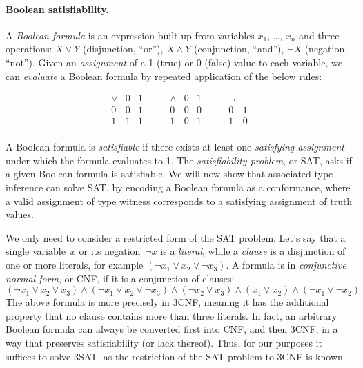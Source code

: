 \documentclass[../generics]{subfiles}
\begin{document}
\paragraph{Boolean satisfiability.}
A \emph{Boolean formula} is an expression built up from variables $x_1$, \ldots, $x_n$ and three operations: $X \vee Y$ (disjunction, ``or''), $X \wedge Y$ (conjunction, ``and''), $\neg X$ (negation, ``not''). Given an \emph{assignment} of a 1 (true) or 0 (false) value to each variable, we can \emph{evaluate} a Boolean formula by repeated application of the below rules:
\begin{ceqn}
\[
\begin{array}{c|cc}
\vee & 0 & 1\\
\hline
0 & 0 & 1\\
1 & 1 & 1\\
\end{array}
\qquad
\begin{array}{c|cc}
\wedge & 0 & 1\\
\hline
0 & 0 & 0\\
1 & 0 & 1\\
\end{array}
\qquad
\begin{array}{c|c}
\neg &\\
\hline
0 & 1\\
1 & 0
\end{array}
\]
\end{ceqn}
A Boolean formula is \emph{satisfiable} if there exists at least one \emph{satisfying assignment} under which the formula evaluates to 1. The \emph{satisfiability problem}, or SAT, asks if a given Boolean formula is satisfiable. We will now show that associated type inference can solve SAT, by encoding a Boolean formula as a conformance, where a valid assignment of type witness corresponds to a satisfying assignment of truth values.

We only need to consider a restricted form of the SAT problem. Let's say that a single variable~$x$ or its negation~$\neg x$ is a \emph{literal}, while a \emph{clause} is a disjunction of one or more literals, for example $(\neg x_1 \vee x_2 \vee \neg x_3)$. A formula is in \emph{conjunctive normal form}, or CNF, if it is a conjunction of clauses:
\[(\neg x_1 \vee x_2 \vee x_3) \wedge (\neg x_1 \vee x_2 \vee \neg x_3) \wedge (\neg x_2 \vee x_3) \wedge (x_1 \vee x_2) \wedge (\neg x_1 \vee \neg x_2)\]
The above formula is more precisely in 3CNF, meaning it has the additional property that no clause contains more than three literals. In fact, an arbitrary Boolean formula can always be converted first into CNF, and then 3CNF, in a way that preserves satisfiability (or lack thereof). Thus, for our purposes it suffices to solve 3SAT, as the restriction of the SAT problem to 3CNF is known.
\end{document}
